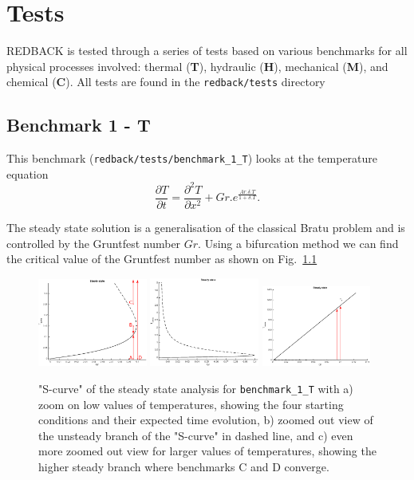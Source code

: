 \documentclass[]{scrreprt}
\newcommand{\redback}{{REDBACK}}
\begin{document}
\chapter{Tests}
\label{chapter:tests}

\redback{} is tested through a series of tests based on various benchmarks for all physical processes involved: thermal (\textbf{T}), hydraulic (\textbf{H}), mechanical (\textbf{M}), and chemical (\textbf{C}). All tests are found in the \texttt{redback/tests} directory
\section{Benchmark 1 - T}

This benchmark (\texttt{redback/tests/benchmark\_1\_T}) looks at the temperature equation 
\begin{equation}
\frac{\partial T}{\partial t} = \frac{\partial^2 T}{\partial x^2} + Gr . e^{\frac{Ar. \delta.T}{1+\delta.T}}.
\end{equation}

The steady state solution is a generalisation of the classical Bratu problem \citep{Bratu1914} and is controlled by the Gruntfest number $Gr$. Using a bifurcation method \citep{Succombe2015} we can find the critical value of the Gruntfest number as shown on Fig.~\ref{fig:benchmark_1_T_succombe}

\begin{figure}
  \centering
  \includegraphics[width=0.32\textwidth]{benchmark_1_T/benchmark_1_T_succombe_0}
  \includegraphics[width=0.32\textwidth]{benchmark_1_T/benchmark_1_T_succombe_1}
  \includegraphics[width=0.32\textwidth]{benchmark_1_T/benchmark_1_T_succombe_2}
  \caption{"S-curve" of the steady state analysis for \texttt{benchmark\_1\_T} with a) zoom on low values of temperatures, showing the four starting conditions and their expected time evolution, b) zoomed out view of the unsteady branch of the "S-curve" in dashed line, and c) even more zoomed out view for larger values of temperatures, showing the higher steady branch where benchmarks C and D converge.}
  \label{fig:benchmark_1_T_succombe}
\end{figure}
\end{document}
